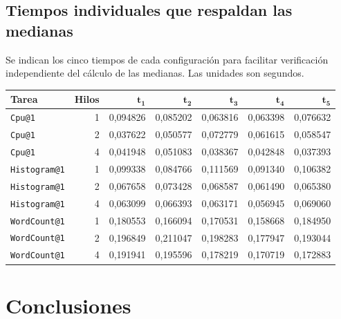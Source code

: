 \documentclass[12pt,a4paper]{article}
\newcommand{\code}[1]{\texttt{#1}}
\begin{document}
\subsection{Tiempos individuales que respaldan las medianas}

Se indican los cinco tiempos de cada configuración para facilitar verificación independiente del cálculo de las medianas. Las unidades son segundos.

\begin{center}
\begin{tabular}{@{}lrrrrrr@{}}
\toprule
\textbf{Tarea} & \textbf{Hilos} & $\boldsymbol{t_1}$ & $\boldsymbol{t_2}$ & $\boldsymbol{t_3}$ & $\boldsymbol{t_4}$ & $\boldsymbol{t_5}$ \\
\midrule
\code{Cpu@1}       & 1 & 0,094826 & 0,085202 & 0,063816 & 0,063398 & 0,076632 \\
\code{Cpu@1}       & 2 & 0,037622 & 0,050577 & 0,072779 & 0,061615 & 0,058547 \\
\code{Cpu@1}       & 4 & 0,041948 & 0,051083 & 0,038367 & 0,042848 & 0,037393 \\
\midrule
\code{Histogram@1} & 1 & 0,099338 & 0,084766 & 0,111569 & 0,091340 & 0,106382 \\
\code{Histogram@1} & 2 & 0,067658 & 0,073428 & 0,068587 & 0,061490 & 0,065380 \\
\code{Histogram@1} & 4 & 0,063099 & 0,066393 & 0,063171 & 0,056945 & 0,069060 \\
\midrule
\code{WordCount@1} & 1 & 0,180553 & 0,166094 & 0,170531 & 0,158668 & 0,184950 \\
\code{WordCount@1} & 2 & 0,196849 & 0,211047 & 0,198283 & 0,177947 & 0,193044 \\
\code{WordCount@1} & 4 & 0,191941 & 0,195596 & 0,178219 & 0,170719 & 0,172883 \\
\bottomrule
\end{tabular}
\end{center}

\section{Conclusiones}
\end{document}
